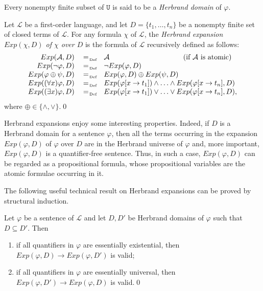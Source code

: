 \documentclass[a4paper]{llncs}
\newcommand{\Lang}{\ensuremath{\mathcal{L}\xspace}} %
\newcommand{\LangPreds}{\Preds_{\Lang}}
\newcommand{\LangTerms}{\Terms_{\Lang}}
\newcommand{\Univ}{\mathtt{U}}
\newcommand{\HExp}{Exp}
\newcommand{\subst}[3]{#1[#2\rightarrow#3]}
\begin{document}
Every nonempty finite subset of $\Univ$ is said to be a
\emph{Herbrand domain} of $\varphi$.

\begin{definition}\label{EXP}
Let $\Lang$ be a first-order language, and let $D=\{t_1, \ldots, 
t_n\}$ be a nonempty finite set of closed terms of $\Lang$. For any 
formula $\chi$ of $\Lang$, the \emph{Herbrand expansion  $\HExp(\chi, 
D)$ of $\chi$ over $D$} is the formula of $\Lang$ recursively defined 
as follows:
%
\[
  \begin{array}{rcll}
  \HExp(\mathcal{A}, D) & \defAs & 
\mathcal{A}\qquad\qquad\qquad\qquad~\qquad\text{(if $\mathcal{A}$ is 
atomic)}  \\
  \HExp(\neg \varphi, D) & \defAs & \neg\HExp(\varphi, D) \\
  \HExp(\varphi \oplus \psi, D) & \defAs & \HExp(\varphi, D) \oplus 
\HExp(\psi, D)\\
  \HExp((\forall x)\varphi, D) & \defAs & 
\HExp(\subst{\varphi}{x}{t_1}) \wedge \ldots \wedge 
\HExp(\subst{\varphi}{x}{t_n}, D)\\
  \HExp((\exists x)\varphi, D) & \defAs & \HExp(\subst{\varphi}{x}{t_1}) \vee 
\ldots \vee \HExp(\subst{\varphi}{x}{t_n}, D),\\
  \end{array}
\]
where $\oplus \in \{\wedge, \vee\}$.\qed
%
\end{definition}

Herbrand expansions enjoy some interesting properties. Indeed, if $D$ 
is a Herbrand domain for a sentence $\varphi$, then all the terms 
occurring in the expansion $\HExp(\varphi, D)$ of
$\varphi$ over $D$ are in the Herbrand universe of $\varphi$ and, more
important, $\HExp(\varphi, D)$ is a
quantifier-free sentence.
Thus, in such a case, $\HExp(\varphi, D)$ can be regarded as a propositional
formula, whose propositional variables are the atomic formulae occurring in it.

The following useful technical result on Herbrand expansions can be 
proved by structural induction.
\begin{lemma}\label{le:Exp}
Let $\varphi$ be a sentence of $\Lang$ and let $D, D'$ be Herbrand 
domains of $\varphi$ such that $D \subseteq D'$. Then
\begin{enumerate}[label=(\alph*)]
\item\label{le:Expa} if all quantifiers in $\varphi$ are essentially 
existential, then $\HExp(\varphi, D) \rightarrow \HExp(\varphi, D')$ 
is valid;

\item\label{le:Expb} if all quantifiers in $\varphi$ are essentially 
universal, then $\HExp(\varphi, D') \rightarrow \HExp(\varphi, D)$ is 
valid.\qed
\end{enumerate}
\end{lemma}
\end{document}
